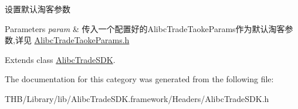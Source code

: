设置默认淘客参数


\begin{DoxyParams}{Parameters}
{\em param} & 传入一个配置好的\+Alibc\+Trade\+Taoke\+Params作为默认淘客参数,详见 \mbox{\hyperlink{_alibc_trade_taoke_params_8h_source}{Alibc\+Trade\+Taoke\+Params.\+h}} \\
\hline
\end{DoxyParams}


Extends class \mbox{\hyperlink{interface_alibc_trade_s_d_k_aa6e5c46a89ab3539e6d95b827d31bae5}{Alibc\+Trade\+S\+DK}}.



The documentation for this category was generated from the following file\+:\begin{DoxyCompactItemize}
\item 
T\+H\+B/\+Library/lib/\+Alibc\+Trade\+S\+D\+K.\+framework/\+Headers/Alibc\+Trade\+S\+D\+K.\+h\end{DoxyCompactItemize}
